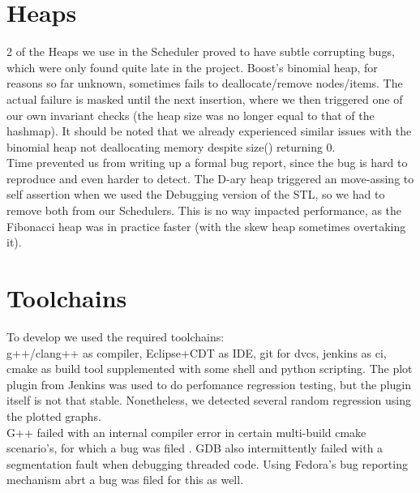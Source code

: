 \documentclass[8pt,a4paper]{report}
\begin{document}
\section{Heaps}
2 of the Heaps we use in the Scheduler proved to have subtle corrupting bugs, which were only found quite late in the project. Boost's binomial heap, for reasons so far unknown, sometimes fails to deallocate/remove nodes/items. The actual failure is masked until the next insertion, where we then triggered one of our own invariant checks (the heap size was no longer equal to that of the hashmap). It should be noted that we already experienced similar issues with the binomial heap not deallocating memory despite size() returning 0. \\ Time prevented us from writing up a formal bug report, since the bug is hard to reproduce and even harder to detect.
The D-ary heap triggered an move-assing to self assertion when we used the Debugging version of the STL, so we had to remove both from our Schedulers. This is no way impacted performance, as the Fibonacci heap was in practice faster (with the skew heap sometimes overtaking it).
\section{Toolchains}
To develop we used the required toolchains:\\ g++/clang++ as compiler, Eclipse+CDT as IDE, git for dvcs, jenkins as ci, cmake as build tool supplemented with some shell and python scripting.
The plot plugin from Jenkins was used to do perfomance regression testing, but the plugin itself is not that stable. Nonetheless, we detected several random regression using the plotted graphs. \\
G++ failed with an internal compiler error in certain multi-build cmake scenario's, for which a  bug was filed \cite{gpp}. GDB also intermittently failed with a segmentation fault when debugging threaded code. Using Fedora's bug reporting mechanism abrt a bug \cite{gdb} was filed for this as well.
\end{document}
